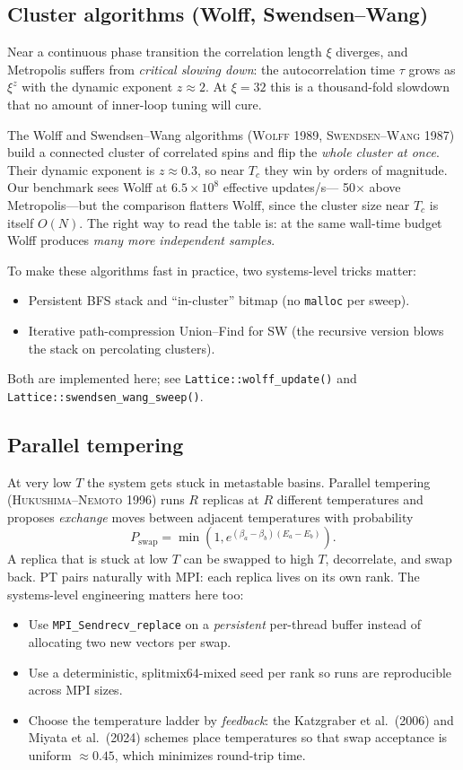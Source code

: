 \documentclass[11pt,letterpaper]{article}
\begin{document}
\subsection{Cluster algorithms (Wolff, Swendsen--Wang)}
Near a continuous phase transition the correlation length $\xi$ diverges,
and Metropolis suffers from \emph{critical slowing down}: the
autocorrelation time $\tau$ grows as $\xi^{z}$ with the dynamic exponent
$z \approx 2$.  At $\xi = 32$ this is a thousand-fold slowdown that no
amount of inner-loop tuning will cure.

The Wolff and Swendsen--Wang algorithms (\textsc{Wolff} 1989,
\textsc{Swendsen--Wang} 1987) build a connected cluster of correlated
spins and flip the \emph{whole cluster at once}.  Their dynamic exponent
is $z \approx 0.3$, so near $T_c$ they win by orders of magnitude.  Our
benchmark sees Wolff at $6.5 \times 10^{8}$ effective updates/s---
50$\times$ above Metropolis---but the comparison flatters Wolff, since
the cluster size near $T_c$ is itself $O(N)$.  The right way to read the
table is: at the same wall-time budget Wolff produces \emph{many more
independent samples}.

To make these algorithms fast in practice, two systems-level tricks
matter:
\begin{itemize}[noitemsep]
  \item Persistent BFS stack and ``in-cluster'' bitmap (no
        \texttt{malloc} per sweep).
  \item Iterative path-compression Union--Find for SW (the recursive
        version blows the stack on percolating clusters).
\end{itemize}
Both are implemented here; see \texttt{Lattice::wolff\_update()} and
\texttt{Lattice::swendsen\_wang\_sweep()}.

\subsection{Parallel tempering}
At very low $T$ the system gets stuck in metastable basins.  Parallel
tempering (\textsc{Hukushima--Nemoto} 1996) runs $R$ replicas at
$R$ different temperatures and proposes \emph{exchange} moves
between adjacent temperatures with probability
\[
  P_{\text{swap}} = \min\!\left(1, e^{(\beta_a - \beta_b)(E_a - E_b)}\right).
\]
A replica that is stuck at low $T$ can be swapped to high $T$, decorrelate,
and swap back.  PT pairs naturally with MPI: each replica lives on its
own rank.  The systems-level engineering matters here too:
\begin{itemize}[noitemsep]
  \item Use \texttt{MPI\_Sendrecv\_replace} on a \emph{persistent}
        per-thread buffer instead of allocating two new vectors per swap.
  \item Use a deterministic, splitmix64-mixed seed per rank so runs are
        reproducible across MPI sizes.
  \item Choose the temperature ladder by \emph{feedback}: the
        Katzgraber et al.\ (2006) and Miyata et al.\ (2024) schemes
        place temperatures so that swap acceptance is uniform $\approx
        0.45$, which minimizes round-trip time.
\end{itemize}
\end{document}
